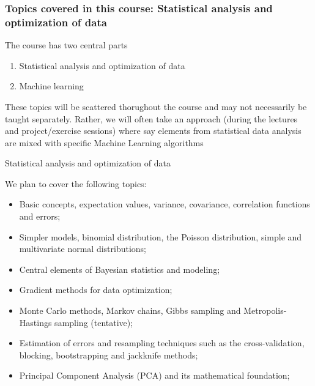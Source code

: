 \documentclass{beamer}
\begin{document}
\begin{frame}
\frametitle{Topics covered in this course: Statistical analysis and optimization of data}

The course has two central parts

\begin{enumerate}
\item Statistical analysis and optimization of data

\item Machine learning
\end{enumerate}

\noindent
These topics will be scattered thorughout the course and may not  necessarily be taught separately. Rather, we will often take an approach (during the lectures and project/exercise sessions) where say elements from statistical data analysis are mixed with specific Machine Learning algorithms

\begin{block}{Statistical analysis and optimization of data }

We plan to cover the following topics:
\begin{itemize}
\item Basic concepts, expectation values, variance, covariance, correlation functions and errors;

\item Simpler models, binomial distribution, the Poisson distribution, simple and multivariate normal distributions;

\item Central elements of Bayesian statistics and modeling;

\item Gradient methods for data optimization;

\item Monte Carlo methods, Markov chains, Gibbs sampling and Metropolis-Hastings sampling (tentative);

\item Estimation of errors and resampling techniques such as the cross-validation, blocking, bootstrapping and jackknife methods;

\item Principal Component Analysis (PCA) and its mathematical foundation;
\end{itemize}

\noindent
\end{block}
\end{frame}
\end{document}
